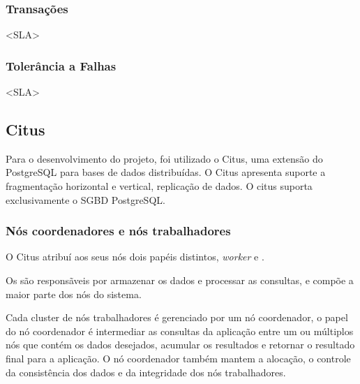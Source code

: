 \subsubsection{Transações}
<SLA>

\subsubsection{Tolerância a Falhas}
<SLA>

\subsection{Citus}
Para o desenvolvimento do projeto, foi utilizado o Citus, uma extensão do PostgreSQL para bases de dados distribuídas.
O Citus apresenta suporte a fragmentação horizontal e vertical, replicação de dados. 
O citus suporta exclusivamente o SGBD PostgreSQL.


\subsubsection{Nós coordenadores e nós trabalhadores}

O  Citus atribuí aos seus nós dois papéis distintos, 
\textit{worker} e .

Os  são responsãveis por armazenar os dados e processar as consultas,
e compõe a maior parte dos nós do sistema.

Cada cluster de nós trabalhadores é gerenciado por um nó coordenador,
o papel do nó coordenador é intermediar as consultas da aplicação entre um ou múltiplos
nós que contém os dados desejados, acumular os resultados e retornar o resultado final para a aplicação.  
O nó coordenador também mantem a alocação, o controle da consistência dos dados 
e da integridade dos nós trabalhadores.

